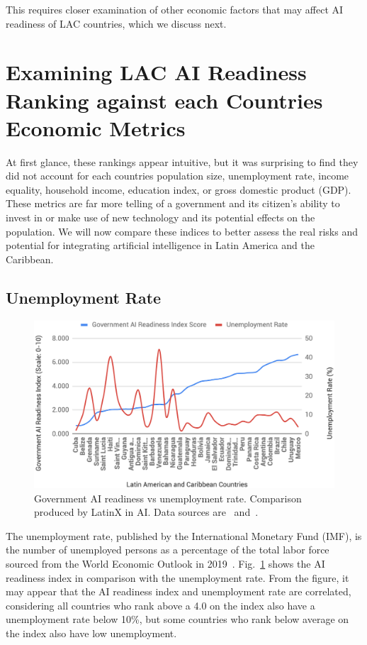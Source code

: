 \documentclass[conference]{IEEEtran}
\begin{document}
This requires closer examination of other economic factors that may affect AI readiness of LAC countries, which we discuss next.


\section{Examining LAC AI Readiness Ranking against each Countries Economic Metrics}

At first glance, these rankings appear intuitive, but it was surprising to find they did not account for each countries population size, unemployment rate, income equality, household income, education index, or gross domestic product (GDP). These metrics are far more telling of a government and its citizen's ability to invest in or make use of new technology and its potential effects on the population. We will now compare these indices to better assess the real risks and potential for integrating artificial intelligence in Latin America and the Caribbean.

\subsection{Unemployment Rate}

\begin{figure}[!b]
\centering
\includegraphics[width=\columnwidth]{unemployment}
\caption{Government AI readiness vs unemployment rate. Comparison produced by LatinX in AI\texttrademark. Data sources are~\cite{miller2019government} and~\cite{nam2019world}.}
\label{fig:unemployment}
\end{figure}

The unemployment rate, published by the International Monetary Fund (IMF), is the number of unemployed persons as a percentage of the total labor force sourced from the World Economic Outlook in 2019~\cite{nam2019world}. Fig.~\ref{fig:unemployment} shows the AI readiness index in comparison with the unemployment rate. From the figure, it may appear that the AI readiness index and unemployment rate are correlated, considering all countries who rank above a 4.0 on the index also have a unemployment rate below 10\%, but some countries who rank below average on the index also have low unemployment.
\end{document}
